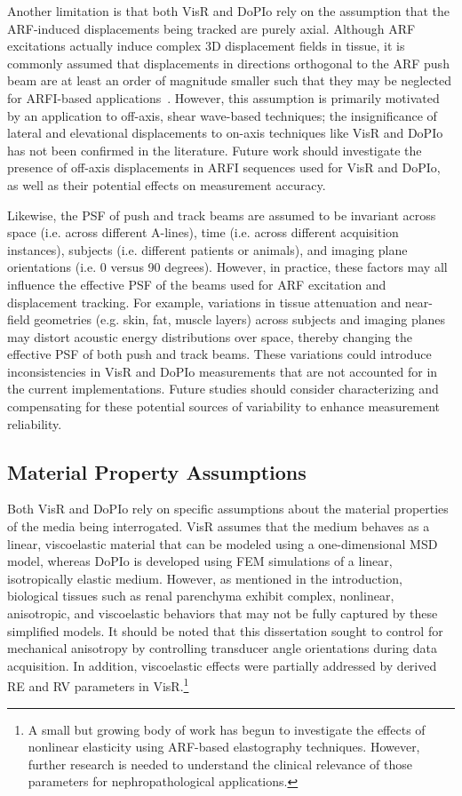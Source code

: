 Another limitation is that both VisR and DoPIo rely on the assumption that the ARF-induced displacements being tracked are purely axial. Although ARF excitations actually induce complex 3D displacement fields in tissue, it is commonly assumed that displacements in directions orthogonal to the ARF push beam are at least an order of magnitude smaller such that they may be neglected for ARFI-based applications~\cite{palmeri_Experimental_2004,palmeri_Ultrasonic_2006}. However, this assumption is primarily motivated by an application to off-axis, shear wave-based techniques; the insignificance of lateral and elevational displacements to on-axis techniques like VisR and DoPIo has not been confirmed in the literature. Future work should investigate the presence of off-axis displacements in ARFI sequences used for VisR and DoPIo, as well as their potential effects on measurement accuracy.

Likewise, the PSF of push and track beams are assumed to be invariant across space (i.e. across different A-lines), time (i.e. across different acquisition instances), subjects (i.e. different patients or animals), and imaging plane orientations (i.e. 0 versus 90 degrees). However, in practice, these factors may all influence the effective PSF of the beams used for ARF excitation and displacement tracking. For example, variations in tissue attenuation and near-field geometries (e.g. skin, fat, muscle layers) across subjects and imaging planes may distort acoustic energy distributions over space, thereby changing the effective PSF of both push and track beams. These variations could introduce inconsistencies in VisR and DoPIo measurements that are not accounted for in the current implementations. Future studies should consider characterizing and compensating for these potential sources of variability to enhance measurement reliability.

\subsection{Material Property Assumptions}

Both VisR and DoPIo rely on specific assumptions about the material properties of the media being interrogated. VisR assumes that the medium behaves as a linear, viscoelastic material that can be modeled using a one-dimensional MSD model, whereas DoPIo is developed using FEM simulations of a linear, isotropically elastic medium. However, as mentioned in the introduction, biological tissues such as renal parenchyma exhibit complex, nonlinear, anisotropic, and viscoelastic behaviors that may not be fully captured by these simplified models. It should be noted that this dissertation sought to control for mechanical anisotropy by controlling transducer angle orientations during data acquisition. In addition, viscoelastic effects were partially addressed by derived RE and RV parameters in VisR.\footnote{
    A small but growing body of work has begun to investigate the effects of nonlinear elasticity using ARF-based elastography techniques. However, further research is needed to understand the clinical relevance of those parameters for nephropathological applications.
} 

